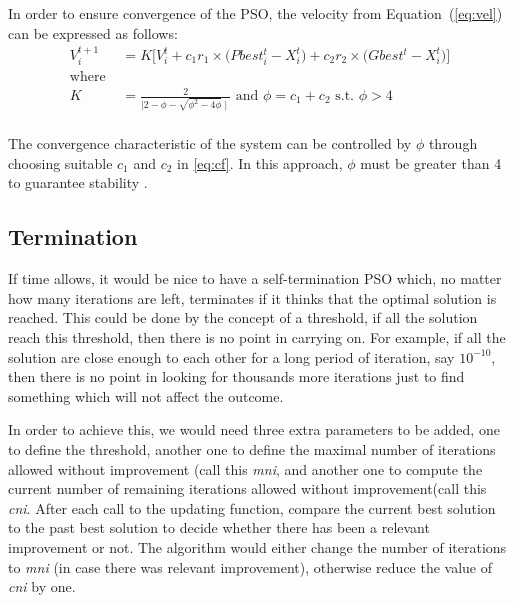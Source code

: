     In order to ensure convergence of the PSO, the velocity from Equation~(\ref{eq:vel}) can be expressed as follows:
    \begin{equation} \label{eq:cf}
      \begin{split}
        V_{i}^{t+1} & = K \Bigg[ V_{i}^{t} + c_1 r_1 \times \Big( Pbest_{i}^{t} - X_{i}^{t} \Big) + c_2 r_2 \times \Big( Gbest^{t} - X_{i}^{t} \Big) \Bigg] \\
        \text{where }\\
        K & = \frac{2}{\mid 2 - \phi - \sqrt{\phi^2 -4\phi} \mid} \text{ and } \phi = c_1 + c_2 \text{ s.t. } \phi > 4  \\
      \end{split}
    \end{equation}

    The convergence characteristic of the system can be controlled by $\phi$ through choosing suitable $c_1$ and $c_2$ in \eqref{eq:cf}. In this approach, $\phi$ must be greater than 4 to guarantee stability \cite{constriction_factor_2}.
    \subsection{Termination} %
    \label{sub:termination}
    If time allows, it would be nice to have a self-termination PSO which, no matter how many iterations are left, terminates if it thinks that the optimal solution is reached. This could be done by the concept of a threshold, if all the solution reach this threshold, then there is no point in carrying on. For example, if all the solution are close enough to each other for a long period of iteration, say $10^{-10}$, then there is no point in looking for thousands more iterations just to find something which will not affect the outcome. 

    In order to achieve this, we would need three extra parameters to be added, one to define the threshold, another one to define the maximal number of iterations allowed without improvement (call this \textit{mni}, and another one to compute the current number of remaining iterations allowed without improvement(call this \textit{cni}. After each call to the updating function, compare the current best solution to the past best solution to decide whether there has been a relevant improvement or not. The algorithm would either change the number of iterations to \textit{mni} (in case there was relevant improvement), otherwise reduce the value of \textit{cni} by one. 
